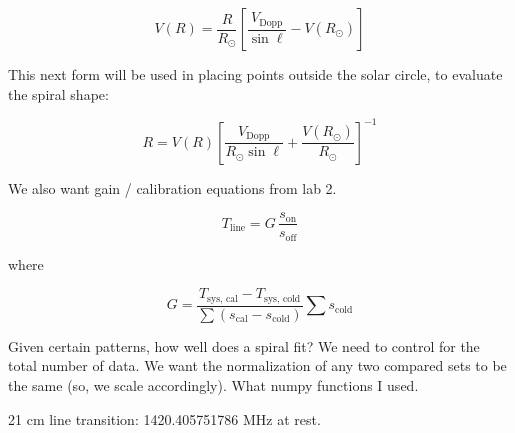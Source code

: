 \documentclass[12pt]{article}
\begin{document}
\begin{equation} \label{eq:vel_curve}
V(R) = \frac{R}{R_\odot} \left[ \frac{V_\text{Dopp}}{\sin \ell} - V(R_\odot) \right] 
\end{equation}

This next form will be used in placing points outside the solar circle, to evaluate the spiral shape:



\begin{equation} \label{eq:outer_spiral}
R = V(R) \left[ \frac{V_\text{Dopp}}{R_\odot \sin \ell} + \frac{V(R_\odot)}{R_\odot} \right]^{-1}
\end{equation}



We also want gain / calibration equations from lab 2.

\begin{equation} \label{eq:line_shape}
T_\text{line} = G \, \frac{s_\text{on}}{s_\text{off}}
\end{equation}

where

\begin{equation} \label{eq:line_gain}
G = \frac{T_\text{sys, cal} - T_\text{sys, cold}}{\sum{(s_\text{cal} - s_\text{cold})}} \sum{s_\text{cold}}
\end{equation}

Given certain patterns, how well does a spiral fit? We need to control for the total number of data. We want the normalization of any two compared sets to be the same (so, we scale accordingly). What numpy functions I used.

21 cm line transition: 1420.405751786 MHz at rest.
\end{document}
